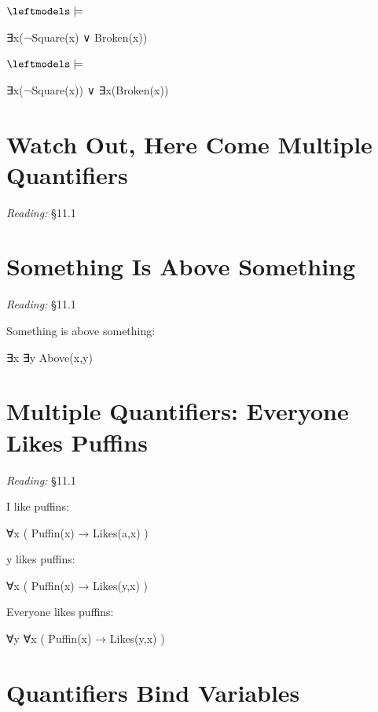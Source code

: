 \documentclass[12pt]{extarticle}
\begin{document}
\begin{multicols*}{3}
\hspace{3mm} $\leftmodels\models$
 
∃x(¬Square(x) ∨ Broken(x))
 
\hspace{3mm} $\leftmodels\models$
 
∃x(¬Square(x)) ∨ ∃x(Broken(x))
 
 
 
\section{Watch Out, Here Come Multiple Quantifiers}
 
\emph{Reading:} §11.1
 
 
 
\section{Something Is Above Something}
 
\emph{Reading:} §11.1
 
\begin{minipage}{\columnwidth}
 
Something is above something:
 
\hspace{3mm} ∃x ∃y Above(x,y)
 
\end{minipage}
 
 
 \columnbreak
 
\section{Multiple Quantifiers: Everyone Likes Puffins}
 
\emph{Reading:} §11.1
 
I like puffins:
 
\hspace{3mm} ∀x ( Puffin(x) → Likes(a,x) )
 
y likes puffins:
 
\hspace{3mm} ∀x ( Puffin(x) → Likes(y,x) )
 
Everyone likes puffins:
 
\hspace{3mm} ∀y ∀x ( Puffin(x) → Likes(y,x) )
 
 
 
\section{Quantifiers Bind Variables}
 

\end{multicols*}
\end{document}
